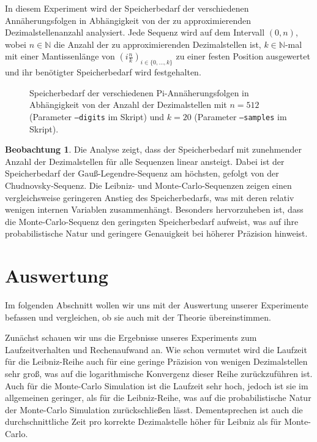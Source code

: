 \documentclass{scrartcl}
\theoremstyle{definition}
\newtheorem{approximation sequence}{Annäherungsfolge}
\newtheorem{observation}{Beobachtung}
\begin{document}
In diesem Experiment wird der Speicherbedarf der verschiedenen
Annäherungsfolgen in Abhängigkeit von der zu approximierenden
Dezimalstellenanzahl analysiert. Jede Sequenz wird auf dem Intervall \((0,
n)\), wobei \(n \in \mathbb{N}\) die Anzahl der zu approximierenden
Dezimalstellen ist, \(k \in \mathbb{N}\)-mal mit einer Mantissenlänge von \(\left(i
\frac{n}{k}\right)_{i \in \{0, \ldots, k\}}\) zu einer festen Position
ausgewertet und ihr benötigter Speicherbedarf wird festgehalten.

\begin{figure}[H]
    \centering
    
    \caption{
        Speicherbedarf der verschiedenen Pi-Annäherungsfolgen in Abhängigkeit
        von der Anzahl der Dezimalstellen mit \(n = 512\) (Parameter
        \texttt{--digits} im Skript) und \(k = 20\) (Parameter
        \texttt{--samples} im Skript).
    }
    \label{fig:memory-usage}
\end{figure}

\begin{observation}
    Die Analyse zeigt, dass der Speicherbedarf mit zunehmender Anzahl der
    Dezimalstellen für alle Sequenzen linear ansteigt. Dabei ist der
    Speicherbedarf der Gauß-Legendre-Sequenz am höchsten, gefolgt von der
    Chudnovsky-Sequenz. Die Leibniz- und Monte-Carlo-Sequenzen zeigen einen
    vergleichsweise geringeren Anstieg des Speicherbedarfs, was mit deren
    relativ wenigen internen Variablen zusammenhängt. Besonders hervorzuheben
    ist, dass die Monte-Carlo-Sequenz den geringsten Speicherbedarf aufweist,
    was auf ihre probabilistische Natur und geringere Genauigkeit bei höherer
    Präzision hinweist.
\end{observation}

\section{Auswertung}
Im folgenden Abschnitt wollen wir uns mit der Auswertung unserer Experimente befassen und vergleichen, ob sie auch mit der Theorie übereinstimmen.

Zunächst schauen wir uns die Ergebnisse unseres Experiments zum Laufzeitverhalten und Rechenaufwand an.
Wie schon vermutet wird die Laufzeit für die Leibniz-Reihe auch für eine geringe Präzision von wenigen Dezimalstellen sehr groß, was auf die logarithmische Konvergenz dieser Reihe
zurückzuführen ist. Auch für die Monte-Carlo Simulation ist die Laufzeit sehr hoch, jedoch ist sie im allgemeinen geringer, als für die Leibniz-Reihe, was auf die probabilistische Natur
der Monte-Carlo Simulation zurückschließen lässt. Dementsprechen ist auch die durchschnittliche Zeit pro korrekte Dezimalstelle höher für Leibniz als für Monte-Carlo.
\end{document}
